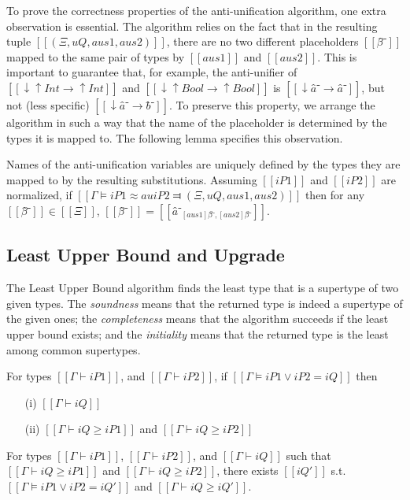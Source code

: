 To prove the correctness properties of the anti-unification algorithm,
one extra observation is essential. The algorithm relies on the fact that
in the resulting tuple $[[(Ξ, uQ, aus1, aus2)]]$,
there are no two different placeholders $[[β̂⁻]]$
mapped to the same pair of types by $[[aus1]]$ and $[[aus2]]$.
This is important to guarantee that, for example, 
the anti-unifier of $[[↓↑Int → ↑Int]]$ and 
$[[↓↑Bool → ↑Bool]]$ is $[[↓â⁻ → â⁻]]$, but not
(less specific) $[[↓â⁻ → b̂⁻]]$.
To preserve this property, we arrange the algorithm in such a way 
that the name of the placeholder is determined by the types it is mapped to.
The following lemma specifies this observation.

\begin{lemma*}
    Names of the anti-unification variables are uniquely defined by
    the types they are mapped to by the resulting substitutions. 
    Assuming $[[iP1]]$ and $[[iP2]]$ are normalized,
        if $[[Γ ⊨ iP1 ≈au iP2 ⫤ (Ξ, uQ, aus1, aus2)]]$
        then for any $[[β̂⁻]] \in [[Ξ]]$,
        $[[β̂⁻]] = [[â⁻_{[aus1]β̂⁻, [aus2]β̂⁻}]]$.
\end{lemma*}

\subsection{Least Upper Bound and Upgrade}
\label{sec:proof-lub-upgrade}

    The Least Upper Bound algorithm finds the least type that is a supertype of two given types.
    The \emph{soundness} means that the returned type is indeed a supertype of the given ones;
    the \emph{completeness} means that the algorithm succeeds if the least upper bound exists;
    and the \emph{initiality} means that the returned type is the least among common supertypes. 

    \begin{lemma*}
        For types $[[Γ ⊢ iP1]]$, and $[[Γ ⊢ iP2]]$,
        if $[[Γ ⊨ iP1 ∨ iP2 = iQ]]$ then
        \begin{enumerate}
            \item[(i)]  $[[Γ ⊢ iQ]]$
            \item[(ii)] $[[Γ ⊢ iQ ≥ iP1]]$ and $[[Γ ⊢ iQ ≥ iP2]]$
        \end{enumerate}
    \end{lemma*}


    \begin{lemma*}
        For types $[[Γ ⊢ iP1]]$, $[[Γ ⊢ iP2]]$, and $[[Γ ⊢ iQ]]$
        such that $[[Γ ⊢ iQ ≥ iP1]]$ and $[[Γ ⊢ iQ ≥ iP2]]$,
        there exists $[[iQ']]$ s.t. $[[Γ ⊨ iP1 ∨ iP2 = iQ']]$ 
        and $[[Γ ⊢ iQ ≥ iQ']]$.
    \end{lemma*}

